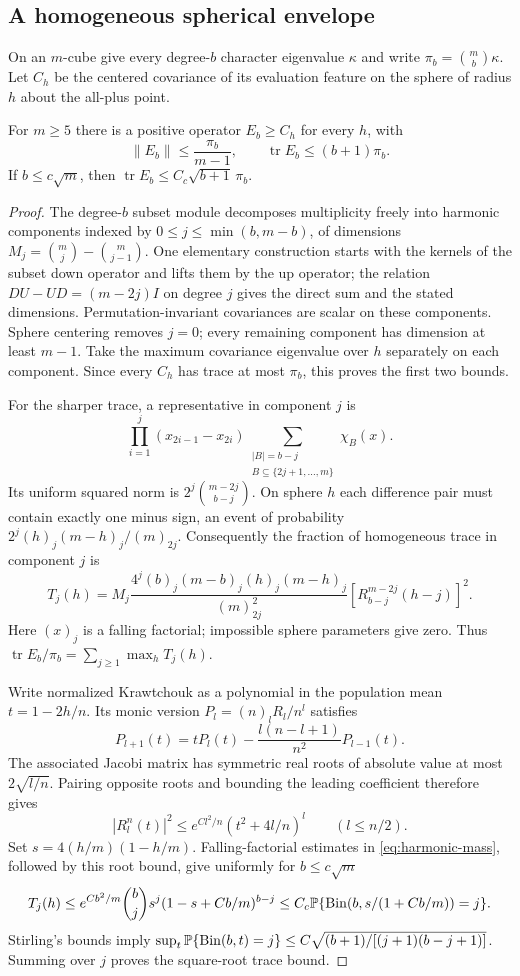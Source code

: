 \subsection{A homogeneous spherical envelope}
On an $m$-cube give every degree-$b$ character eigenvalue $\kappa$ and
write $\pi_b=\binom mb\kappa$. Let $C_h$ be the centered covariance of
its evaluation feature on the sphere of radius $h$ about the all-plus
point.
\begin{lemma}\label{lem:homogeneous-envelope}
For $m\ge5$ there is a positive operator $E_b\ge C_h$ for every $h$,
with
\[
 \|E_b\|\le\frac{\pi_b}{m-1},\qquad
 \operatorname{tr}E_b\le(b+1)\pi_b.
\]
If $b\le c\sqrt m$, then
$\operatorname{tr}E_b\le C_c\sqrt{b+1}\,\pi_b$.
\end{lemma}
\begin{proof}
The degree-$b$ subset module decomposes multiplicity freely into
harmonic components indexed by $0\le j\le\min(b,m-b)$, of dimensions
$M_j=\binom mj-\binom m{j-1}$. One elementary construction starts with
the kernels of the subset down operator and lifts them by the up
operator; the relation $DU-UD=(m-2j)I$ on degree $j$ gives the direct
sum and the stated dimensions. Permutation-invariant covariances are
scalar on these components. Sphere centering removes $j=0$; every
remaining component has dimension at least $m-1$. Take the maximum
covariance eigenvalue over $h$ separately on each component. Since every
$C_h$ has trace at most $\pi_b$, this proves the first two bounds.

For the sharper trace, a representative in component $j$ is
\[
 \prod_{i=1}^j(x_{2i-1}-x_{2i})
 \sum_{\substack{|B|=b-j\\B\subseteq\{2j+1,\ldots,m\}}}\chi_B(x).
\]
Its uniform squared norm is $2^j\binom{m-2j}{b-j}$.
On sphere $h$ each difference pair must contain exactly one minus sign,
an event of probability $2^j(h)_j(m-h)_j/(m)_{2j}$.
Consequently the fraction of homogeneous trace in component $j$ is
\begin{equation}\label{eq:harmonic-mass}
 T_j(h)=M_j\frac{4^j(b)_j(m-b)_j(h)_j(m-h)_j}{(m)_{2j}^2}
       \left[R_{b-j}^{m-2j}(h-j)\right]^2.
\end{equation}
Here $(x)_j$ is a falling factorial; impossible sphere parameters give
zero. Thus $\operatorname{tr}E_b/\pi_b=\sum_{j\ge1}\max_hT_j(h)$.

Write normalized Krawtchouk as a polynomial in the population mean
$t=1-2h/n$. Its monic version $P_l=(n)_lR_l/n^l$ satisfies
\[
 P_{l+1}(t)=tP_l(t)-\frac{l(n-l+1)}{n^2}P_{l-1}(t).
\]
The associated Jacobi matrix has symmetric real roots of absolute value
at most $2\sqrt{l/n}$. Pairing opposite roots and bounding the leading
coefficient therefore gives
\[
 |R_l^n(t)|^2\le e^{Cl^2/n}(t^2+4l/n)^l\qquad(l\le n/2).
\]
Set $s=4(h/m)(1-h/m)$. Falling-factorial estimates in
\eqref{eq:harmonic-mass}, followed by this root bound, give uniformly
for $b\le c\sqrt m$
\[
 T_j(h)\le e^{Cb^2/m}\binom bj
               s^j(1-s+Cb/m)^{b-j}
 \le C_c\mathbb P\{\operatorname{Bin}(b,s/(1+Cb/m))=j\}.
\]
Stirling's bounds imply
$\sup_t\mathbb P\{\operatorname{Bin}(b,t)=j\}
 \le C\sqrt{(b+1)/[(j+1)(b-j+1)]}$.
Summing over $j$ proves the square-root trace bound.
\end{proof}

